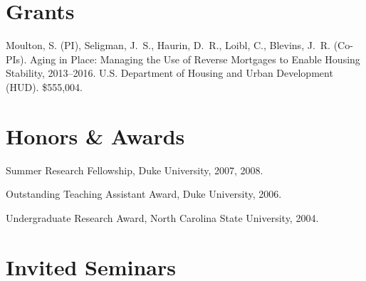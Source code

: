 \documentclass[10pt,letterpaper]{article}
\renewenvironment{itemize}{
  \begin{list}{}{
      \setlength{\leftmargin}{1.5em}
      \setlength{\itemsep}{0.25em}
      \setlength{\parskip}{0pt}
      \setlength{\parsep}{0.25em}
    }
}{
  \end{list}
}
\begin{document}
\section*{Grants}

\begin{itemize}
\item Moulton, S. (PI),
Seligman, J.~S., Haurin, D.~R., Loibl, C., Blevins, J.~R. (Co-PIs).
Aging in Place: Managing the Use of Reverse Mortgages to Enable Housing Stability,
2013--2016.
U.S. Department of Housing and Urban Development (HUD).
\$555,004.
\end{itemize}

\section*{Honors \& Awards}

\begin{itemize}
\item Summer Research Fellowship, Duke University, 2007, 2008.
\item Outstanding Teaching Assistant Award, Duke University, 2006.
\item Undergraduate Research Award, North Carolina State University, 2004.
\end{itemize}

\section*{Invited Seminars}
\end{document}
